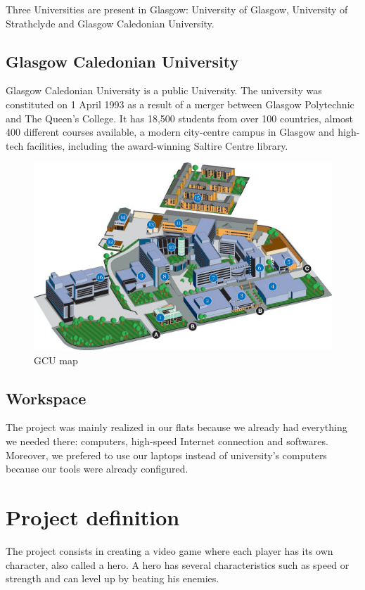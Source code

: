 \documentclass{scrreprt}
\begin{document}
		  Three Universities are present in Glasgow: University of Glasgow, University of
		  Strathclyde and Glasgow Caledonian University.\\

		  \section{Glasgow Caledonian University}
		  Glasgow Caledonian University is a public University. The university was constituted
		  on 1 April 1993 as a result of a merger between Glasgow Polytechnic
		  and The Queen's College. It has 18,500 students from over 100 countries, almost 400
		  different courses available, a modern city-centre campus in Glasgow and high-tech facilities,
		  including the award-winning Saltire Centre library.\\
		  \begin{figure}[h]
		  \begin{center}
		  \includegraphics[scale=0.4]{GCU_map.jpg}
		 \caption{GCU map}
		  \end{center}
		  \end{figure}

		  \section{Workspace}
		  The project was mainly realized in our flats because we already had everything we needed there:
		  computers, high-speed Internet connection and softwares. Moreover, we prefered to use our laptops
		  instead of university's computers because our tools were already configured.

		  \chapter{Project definition}
		  The project consists in creating a video game where each player has its own character, also 
		  called a hero. A hero has several characteristics such as speed or strength and can level up by beating his enemies.\\
\end{document}
